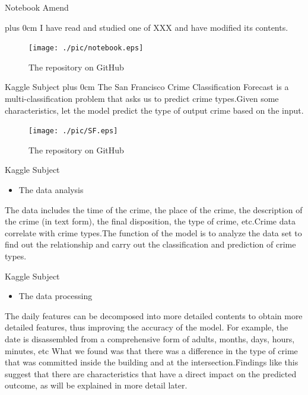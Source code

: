 \documentclass[
 size=14pt,
 paper=smartboard,  %
 mode=present, 		%
 display=slides, 	%
 style=tuliplab,  	%
 pauseslide,
 fleqn,leqno]{powerdot}
\renewcommand{\raggedright}{\leftskip=0pt \rightskip=0pt plus 0cm}
\begin{document}
\begin{slide}{Notebook Amend}

\raggedright
I have read and studied one of XXX and have modified its contents.

\begin{center}
	\begin{figure}[htbp]
		\texttt{[image: ./pic/notebook.eps]}
		\caption{The repository on GitHub}
	\end{figure}
\end{center}


\end{slide}
\begin{slide}{Kaggle Subject}
	\raggedright
	The San Francisco Crime Classification Forecast is a multi-classification problem that asks us to predict crime types.Given some characteristics, let the model predict the type of output crime based on the input.
	\begin{center}
		\begin{figure}[htbp]
			\texttt{[image: ./pic/SF.eps]}
			\caption{The repository on GitHub}
		\end{figure}
	\end{center}

\end{slide}

\begin{slide}[toc=,bm=]{Kaggle Subject}
	\begin{itemize}
	\item The data analysis
	\end{itemize}
	\bigskip
	
	The data includes the time of the crime, the place of the crime, the description of the crime (in text form), the final disposition, the type of crime, etc.Crime data correlate with crime types.The function of the model is to analyze the data set to find out the relationship and carry out the classification and prediction of crime types.
	
\end{slide}

\begin{slide}[toc=,bm=]{Kaggle Subject}
	\begin{itemize}
	\item The data processing
	\end{itemize}
	\bigskip
	
	The daily features can be decomposed into more detailed contents to obtain more detailed features, thus improving the accuracy of the model.
	For example, the date is disassembled from a comprehensive form of adults, months, days, hours, minutes, etc
	What we found was that there was a difference in the type of crime that was committed inside the building and at the intersection.Findings like this suggest that there are characteristics that have a direct impact on the predicted outcome, as will be explained in more detail later.
\end{slide}
\end{document}
